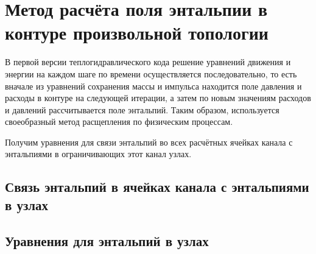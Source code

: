
\section{Метод расчёта поля энтальпии в контуре произвольной топологии}
\label{sec:section7}
В первой версии теплогидравлического кода решение уравнений движения и энергии на каждом шаге по времени осуществляется последовательно, то есть вначале из уравнений сохранения массы и импульса находится поле давления и расходы в контуре на следующей итерации, а затем по новым значениям расходов и давлений рассчитывается поле энтальпий. Таким образом, используется своеобразный метод расщепления по физическим процессам.

Получим уравнения для связи энтальпий во всех расчётных ячейках канала с энтальпиями в ограничивающих этот канал узлах.
\subsection{Связь энтальпий в ячейках канала с энтальпиями в узлах}	

\subsection{Уравнения для энтальпий в узлах}	

\newpage